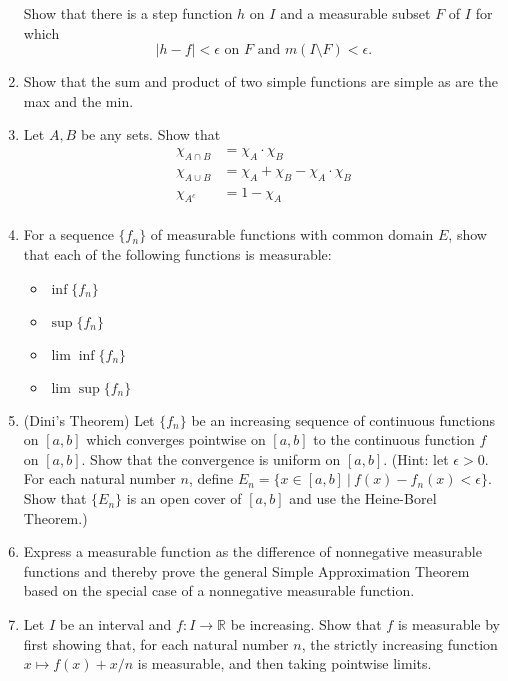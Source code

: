 \begin{enumerate}
    Show that there is a step function $h$ on $I$ and a measurable subset $F$ of $I$ for which 
    \[
        |h-f|<\epsilon\text{ on }F\text{ and }m(I\setminus F)<\epsilon.    
    \]
    \item Show that the sum and product of two simple functions are simple as are the max and the min.
    \item Let $A,B$ be any sets. Show that
    \begin{align*}
        \chi_{A\cap B}&=\chi_A\cdot\chi_B\\
        \chi_{A\cup B}&=\chi_A+\chi_B-\chi_A\cdot\chi_B\\
        \chi_{A^c}&=1-\chi_A\\
    \end{align*}
    \item For a sequence $\{f_n\}$ of measurable functions with common domain $E$, show that each of the following functions is measurable:
    \begin{itemize}
        \item $\inf\{f_n\}$
        \item $\sup\{f_n\}$
        \item $\lim\inf\{f_n\}$
        \item $\lim\sup\{f_n\}$
    \end{itemize}
    \item (Dini's Theorem) Let $\{f_n\}$ be an increasing sequence of continuous functions on $[a,b]$ which converges pointwise on $[a,b]$ to the continuous function $f$ on $[a,b]$.
    Show that the convergence is uniform on $[a,b]$. (Hint: let $\epsilon>0$. For each natural number $n$, define $E_n=\{x\in[a,b]\ |\ f(x)-f_n(x)<\epsilon\}$. Show that $\{E_n\}$ is an open cover of $[a,b]$ and use the Heine-Borel Theorem.)
    \item Express a measurable function as the difference of nonnegative measurable functions and thereby prove the general Simple Approximation Theorem based on the special case of a nonnegative measurable function.
    \item Let $I$ be an interval and $f:I\to\mathbb{R}$ be increasing. Show that $f$ is measurable by first showing that, for each natural number $n$, the strictly increasing function $x\mapsto f(x)+x/n$ is measurable, and then taking pointwise limits.
\end{enumerate}

